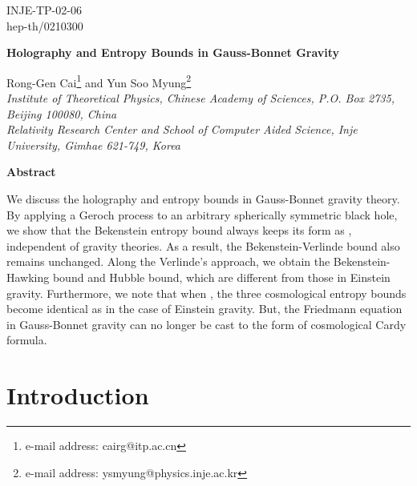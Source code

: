 \documentclass[a4paper,12pt]{article}
\providecommand{\sect}[1]{\setcounter{equation}{0}\section{#1}}
\begin{document}
\topmargin 0pt \oddsidemargin 0mm

\renewcommand{\thefootnote}{\fnsymbol{footnote}}
\begin{titlepage}
\begin{flushright}
INJE-TP-02-06\\
hep-th/0210300
\end{flushright}

\vspace{5mm}
\begin{center}
{\Large \bf Holography and Entropy Bounds in Gauss-Bonnet Gravity}
 \vspace{12mm}

{\large Rong-Gen Cai\footnote{e-mail address: cairg@itp.ac.cn}\coordHE{}
 and Yun Soo Myung\footnote{e-mail
 address: ysmyung@physics.inje.ac.kr}\coordHE{}}
 \\
\vspace{10mm} {\em {}\coordHE{} Institute of Theoretical Physics, Chinese
Academy of Sciences, P.O. Box 2735, Beijing 100080, China \\
\coordHE{} Relativity Research Center and School of Computer Aided
Science, Inje University, Gimhae 621-749, Korea}
\end{center}

\vspace{20mm}
 \centerline{{\bf{Abstract}}}
 \vspace{5mm}
We discuss the holography and entropy bounds in Gauss-Bonnet gravity theory.
By applying a Geroch process to an arbitrary spherically symmetric black
hole, we show that the Bekenstein entropy bound always keeps its form  as
\coordHE{}, independent of gravity theories. As a result,
the Bekenstein-Verlinde bound also remains unchanged.  Along the Verlinde's
approach, we obtain  the Bekenstein-Hawking bound and Hubble bound, which
are different from those in Einstein gravity. Furthermore, we note that when
\coordHE{},  the three cosmological entropy bounds become identical as in the case of
Einstein gravity. But, the Friedmann equation in Gauss-Bonnet gravity
can no longer be cast to  the form of cosmological Cardy formula.

\end{titlepage}

\newpage
\renewcommand{\thefootnote}{\arabic{footnote}}
\setcounter{footnote}{0} \setcounter{page}{2}

\sect{Introduction}
\end{document}
